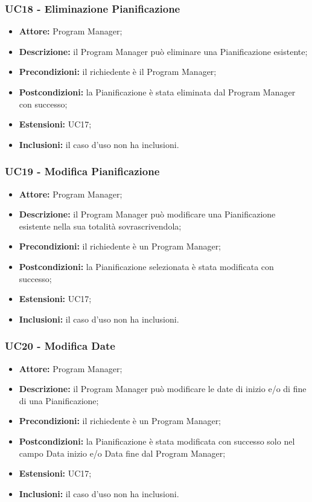 \subsubsection*{UC18 - Eliminazione Pianificazione}
\begin{itemize}[label=$\circ$]
\item \textbf{Attore:} Program Manager;
\item \textbf{Descrizione:} il Program Manager può eliminare una Pianificazione esistente;
\item \textbf{Precondizioni:} il richiedente è il Program Manager;
\item \textbf{Postcondizioni:} la Pianificazione è stata eliminata dal Program Manager con successo;
\item \textbf{Estensioni:} UC17;
\item \textbf{Inclusioni:} il caso d'uso non ha inclusioni.
\end{itemize}

\subsubsection*{UC19 - Modifica Pianificazione}
\begin{itemize}[label=$\circ$]
\item \textbf{Attore:} Program Manager;
\item \textbf{Descrizione:} il Program Manager può modificare una Pianificazione esistente nella sua totalità sovrascrivendola;
\item \textbf{Precondizioni:} il richiedente è un Program Manager;
\item \textbf{Postcondizioni:} la Pianificazione selezionata è stata modificata con successo;
\item \textbf{Estensioni:} UC17;
\item \textbf{Inclusioni:} il caso d'uso non ha inclusioni.
\end{itemize}

\subsubsection*{UC20 - Modifica Date}
\begin{itemize}[label=$\circ$]
\item \textbf{Attore:} Program Manager;
\item \textbf{Descrizione:} il Program Manager può modificare le date di inizio e/o di fine di una Pianificazione;
\item \textbf{Precondizioni:} il richiedente è un Program Manager;
\item \textbf{Postcondizioni:} la Pianificazione è stata modificata con successo solo nel campo Data inizio e/o Data fine dal Program Manager;
\item \textbf{Estensioni:} UC17;
\item \textbf{Inclusioni:} il caso d'uso non ha inclusioni.
\end{itemize}

